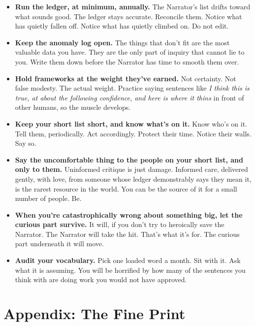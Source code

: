 \documentclass[11pt, letterpaper]{article}
\begin{document}
\begin{itemize}[leftmargin=1.5em, itemsep=7pt]
  \item \textbf{Run the ledger, at minimum, annually.} The Narrator's list drifts toward what sounds good. The ledger stays accurate. Reconcile them. Notice what has quietly fallen off. Notice what has quietly climbed on. Do not edit.

  \item \textbf{Keep the anomaly log open.} The things that don't fit are the most valuable data you have. They are the only part of inquiry that cannot lie to you. Write them down before the Narrator has time to smooth them over.

  \item \textbf{Hold frameworks at the weight they've earned.} Not certainty. Not false modesty. The actual weight. Practice saying sentences like \textit{I think this is true, at about the following confidence, and here is where it thins} in front of other humans, so the muscle develops.

  \item \textbf{Keep your short list short, and know what's on it.} Know who's on it. Tell them, periodically. Act accordingly. Protect their time. Notice their walls. Say so.

  \item \textbf{Say the uncomfortable thing to the people on your short list, and only to them.} Uninformed critique is just damage. Informed care, delivered gently, with love, from someone whose ledger demonstrably says they mean it, is the rarest resource in the world. You can be the source of it for a small number of people. Be.

  \item \textbf{When you're catastrophically wrong about something big, let the curious part survive.} It will, if you don't try to heroically save the Narrator. The Narrator will take the hit. That's what it's for. The curious part underneath it will move.

  \item \textbf{Audit your vocabulary.} Pick one loaded word a month. Sit with it. Ask what it is assuming. You will be horrified by how many of the sentences you think with are doing work you would not have approved.
\end{itemize}

\section*{Appendix: The Fine Print}
\end{document}

